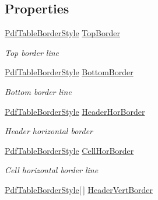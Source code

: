 \subsection*{Properties}
\begin{DoxyCompactItemize}
\item 
\hyperlink{class_pdf_file_writer_1_1_pdf_table_border_style}{Pdf\+Table\+Border\+Style} \hyperlink{class_pdf_file_writer_1_1_pdf_table_border_a4a2deb0bcdd4fbacccae439ddda6b4f8}{Top\+Border}
\begin{DoxyCompactList}\small\item\em Top border line \end{DoxyCompactList}\item 
\hyperlink{class_pdf_file_writer_1_1_pdf_table_border_style}{Pdf\+Table\+Border\+Style} \hyperlink{class_pdf_file_writer_1_1_pdf_table_border_a85903e88967753ac21b850c0f1f52566}{Bottom\+Border}
\begin{DoxyCompactList}\small\item\em Bottom border line \end{DoxyCompactList}\item 
\hyperlink{class_pdf_file_writer_1_1_pdf_table_border_style}{Pdf\+Table\+Border\+Style} \hyperlink{class_pdf_file_writer_1_1_pdf_table_border_ab7da822c405dcf2488ac767f60559bc4}{Header\+Hor\+Border}
\begin{DoxyCompactList}\small\item\em Header horizontal border \end{DoxyCompactList}\item 
\hyperlink{class_pdf_file_writer_1_1_pdf_table_border_style}{Pdf\+Table\+Border\+Style} \hyperlink{class_pdf_file_writer_1_1_pdf_table_border_a3411c61924b621bc94be87303ab157f3}{Cell\+Hor\+Border}
\begin{DoxyCompactList}\small\item\em Cell horizontal border line \end{DoxyCompactList}\item 
\hyperlink{class_pdf_file_writer_1_1_pdf_table_border_style}{Pdf\+Table\+Border\+Style}\mbox{[}$\,$\mbox{]} \hyperlink{class_pdf_file_writer_1_1_pdf_table_border_aacb1240350d31161b0a105488584870f}{Header\+Vert\+Border}

\end{DoxyCompactItemize}

